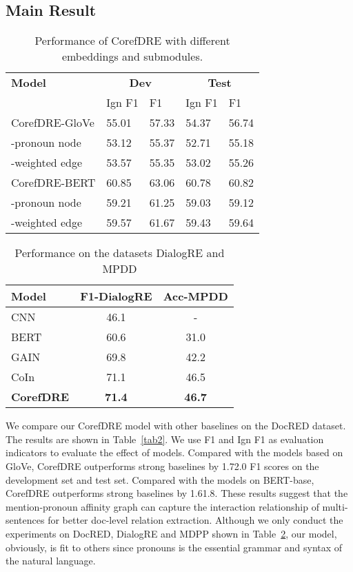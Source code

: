 \documentclass{article}
\begin{document}
\subsection{Main Result}

\begin{table}
\centering
\setlength{\belowcaptionskip}{-0.4cm}
\begin{tabular}{lllll} \toprule
\textbf{Model} & \multicolumn{2}{c}{\textbf{Dev}}&\multicolumn{2}{c}{\textbf{Test}}   \\
\cline{2-5} &    Ign F1 & F1 & Ign F1 & F1  \\
  \midrule
  CorefDRE-GloVe &  55.01& 57.33 & 54.37 & 56.74  \\
  -pronoun node &  53.12 & 55.37 & 52.71 & 55.18   \\
  -weighted edge &  53.57 & 55.35 & 53.02 & 55.26   \\
  \midrule
  CorefDRE-BERT &  60.85 & 63.06 & 60.78 & 60.82   \\
  -pronoun node &  59.21 & 61.25 & 59.03 & 59.12   \\
  -weighted edge &  59.57 & 61.67 & 59.43 & 59.64   \\
  \bottomrule
  \end{tabular}
  \caption{Performance of CorefDRE with different embeddings and submodules.}
  \label{tab3}
\end{table}

\begin{table}
\centering
\setlength{\belowcaptionskip}{-0.4cm}
\begin{tabular}{lcc}
\hline
    \textbf{Model}  & \textbf{ F1-DialogRE} & \textbf{Acc-MPDD} \\
\hline
CNN\cite{yu2020dialogue}       & 46.1  & -     \\
BERT\cite{long2021consistent}       & 60.6  & 31.0      \\
GAIN\cite{long2021consistent}     & 69.8  & 42.2   \\
CoIn\cite{long2021consistent}     & 71.1  & 46.5   \\
\hline
\textbf{CorefDRE}   & \textbf{71.4}  & \textbf{46.7}    \\
\hline
\end{tabular}
\caption{Performance on the datasets DialogRE and MPDD}
\label{tab4}
\end{table}
We compare our CorefDRE model with other baselines on the DocRED dataset. The results are shown in Table~\ref{tab2}. We use F1 and Ign F1 as evaluation indicators to evaluate the effect of models.
Compared with the models based on GloVe, CorefDRE outperforms strong baselines by 1.72.0 F1 scores on the development set and test set. Compared with the models on BERT-base, CorefDRE outperforms strong baselines by 1.61.8. These results suggest that the mention-pronoun affinity graph can capture the interaction relationship of multi-sentences for better doc-level relation extraction. Although we only conduct the experiments on DocRED, DialogRE and MDPP shown in Table~\ref{tab4}, our model, obviously, is fit to others since pronouns is the essential grammar and syntax of the natural language.
\end{document}
